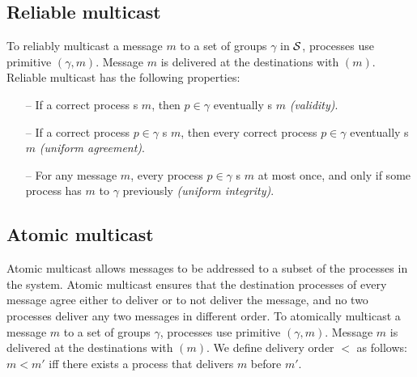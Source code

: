 \subsection{Reliable multicast}
\label{sec:rmcast}
To reliably multicast a message $m$ to a set of groups $\gamma$ in $\mathcal{S}$, processes use
primitive \rmcast$(\gamma, m)$.  Message $m$ is delivered at the destinations
with \rmdel$(m)$.  Reliable multicast has the following properties:

\begin{itemize}

    \item[--] If a correct process \rmcast{}s $m$, then  $p \in \gamma$ eventually \rmdel{}s $m$ \emph{(validity)}.

    \item[--] If a correct process $p \in \gamma$ \rmdel{}s $m$, then every correct
      process $p \in \gamma$ eventually \rmdel{}s $m$ \emph{(uniform agreement)}.

    \item[--] For any message $m$, every process $p \in \gamma$ \rmdel{}s $m$
      at most once, and only if some process has \rmcast{} $m$ to $\gamma$
      previously \emph{(uniform integrity)}.

\end{itemize}

\subsection{Atomic multicast}
\label{sec:amcast}
Atomic multicast allows messages to be addressed to a subset of the processes in
the system. Atomic multicast ensures that the destination processes of every
message agree either to deliver or to not deliver the message, and no two
processes deliver any two messages in different order. To atomically multicast a
message $m$ to a set of groups $\gamma$, processes use primitive
\amcast$(\gamma, m)$.  Message $m$ is delivered at the destinations with
\amdel$(m)$.  We define delivery order $<$ as follows: $m < m'$ iff there exists
a process that delivers $m$ before $m'$.

